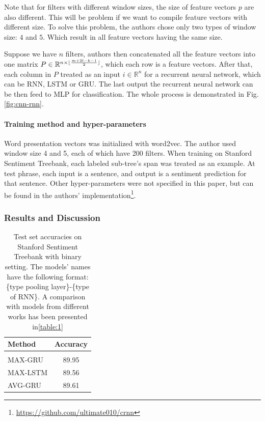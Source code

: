 Note that for filters with different window sizes, the size of feature vectors \(p\) are also different. 
This will be problem if we want to compile feature vectors with different size.
To solve this problem, the authors chose only two types of window size: \(4\) and \(5\).
Which result in all feature vectors having the same size. 

Suppose we have \(n\) filters, authors then concatenated all the feature vectors into one matrix \(P \in \mathbb{R}^{n \times \lfloor \frac{m + 2l - k - 1}{2} \rfloor}\), which each row is a feature vectors. 
After that, each column in \(P\) treated as an input \(i \in \mathbb{R}^{n}\) for a recurrent neural network, which can be RNN, LSTM or GRU.
The last output the recurrent neural network can be then feed to MLP for classification.
The whole process is demonstrated in Fig.\ref{fig:cnn-rnn}.

\paragraph{Training method and hyper-parameters} 
Word presentation vectors was initialized with word2vec\cite{word2vec}.
The author used window size 4 and 5, each of which have 200 filters. 
When training on Stanford Sentiment Treebank, each labeled sub-tree's span was treated as an example.
At test phrase, each input is a sentence, and output is a sentiment prediction for that sentence.
Other hyper-parameters were not specified in this paper, but can be found in the authors' implementation\footnote{\url{https://github.com/ultimate010/crnn}}.

\subsubsection{Results and Discussion}
\begin{table}[H]
\centering
\begin{tabular}{l c} 
 \hline
 \hline 
 Method & Accuracy \\ [0.5ex] 
 \hline
 \hline
 \\  
 MAX-GRU & 89.95 \\ 
 MAX-LSTM & 89.56 \\ 
 AVG-GRU & 89.61 \\ 
 \hline
 \hline
\end{tabular}
\caption{Test set accuracies on Stanford Sentiment Treebank with binary setting. 
The models' names have the following format: \{type pooling layer\}-\{type of RNN\}.
A comparison with models from different works has been presented in\ref{table:1}}
\label{table:cnn-rnn}
\end{table}

